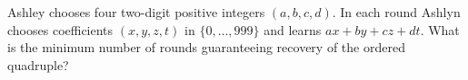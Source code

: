 Ashley chooses four two-digit positive integers $(a,b,c,d)$. In each round Ashlyn chooses coefficients $(x,y,z,t)$ in $\{0,\ldots,999\}$ and learns $ax+by+cz+dt$. What is the minimum number of rounds guaranteeing recovery of the ordered quadruple?
